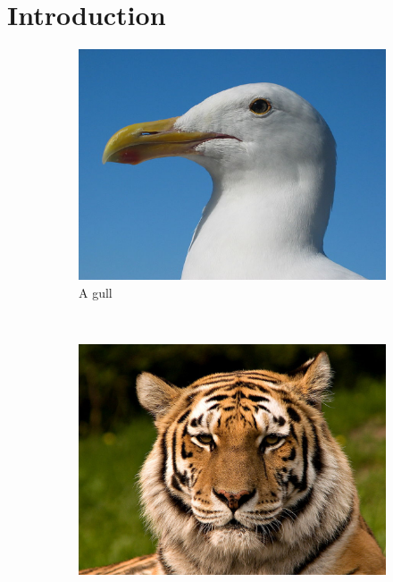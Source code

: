 \documentclass[12pt]{article}
\begin{document}
\section{Introduction}

\begin{figure}
    \centering
    \begin{subfigure}[b]{0.3\textwidth}
        \includegraphics[width=\textwidth]{gull.eps}
        \caption{A gull}
        \label{fig:gull}
    \end{subfigure}
    ~ %
    \begin{subfigure}[b]{0.3\textwidth}
        \includegraphics[width=\textwidth]{tiger.eps}

\end{subfigure}
\end{figure}
\end{document}
